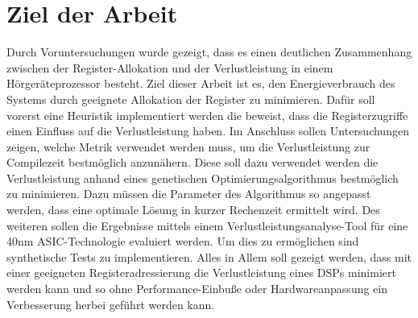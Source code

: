 \section{Ziel der Arbeit}
\label{sec:ziele}
Durch Voruntersuchungen wurde gezeigt, dass es einen deutlichen Zusammenhang zwischen der Register-Allokation und der Verlustleistung in einem Hörgeräteprozessor besteht. Ziel dieser Arbeit ist es, den Energieverbrauch des Systems durch geeignete Allokation der Register zu minimieren. Dafür soll vorerst eine Heuristik implementiert werden die beweist, dass die Registerzugriffe einen Einfluss auf die Verlustleistung haben. Im Anschluss sollen Untersuchungen zeigen, welche Metrik verwendet werden muss, um die Verlustleistung zur Compilezeit bestmöglich anzunähern. Diese soll dazu verwendet werden die Verlustleistung anhand eines genetischen Optimierungsalgorithmus bestmöglich zu minimieren. Dazu müssen die Parameter des Algorithmus so angepasst werden, dass eine optimale Lösung in kurzer Rechenzeit ermittelt wird. Des weiteren sollen die Ergebnisse mittels einem Verlustleistungsanalyse-Tool für eine 40nm ASIC-Technologie evaluiert werden. Um dies zu ermöglichen sind synthetische Tests zu implementieren. Alles in Allem soll gezeigt werden, dass mit einer geeigneten Registeradressierung die Verlustleistung eines DSPs minimiert werden kann und so ohne Performance-Einbuße oder Hardwareanpassung ein Verbesserung herbei geführt werden kann.

%
